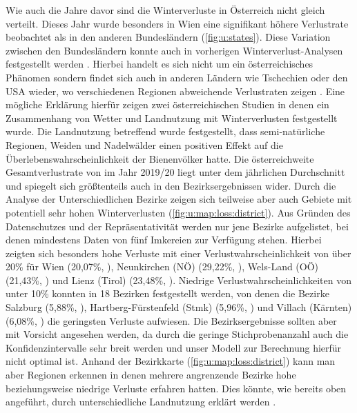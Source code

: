 Wie auch die Jahre davor sind die Winterverluste in Österreich nicht gleich verteilt. Dieses Jahr wurde besonders in Wien eine signifikant höhere Verlustrate beobachtet als in den anderen Bundesländern (\cref{fig:u:states}). Diese Variation zwischen den Bundesländern konnte auch in vorherigen Winterverlust-Analysen festgestellt werden \citep{crailsheim2018, brodschneider2018a, brodschneider2019b, oberreiter2020}. Hierbei handelt es sich nicht um ein österreichisches Phänomen sondern findet sich auch in anderen Ländern wie Tschechien oder den USA wieder, wo verschiedenen Regionen abweichende Verlustraten zeigen \citep{brodschneider2019,vanengelsdorp2008,vanengelsdorp2010}. Eine mögliche Erklärung hierfür zeigen zwei österreichischen Studien in denen ein Zusammenhang von Wetter \citep{switanek2017} und Landnutzung \citep{kuchling2018} mit Winterverlusten festgestellt wurde. Die Landnutzung betreffend wurde festgestellt, dass semi-natürliche Regionen, Weiden und Nadelwälder einen positiven Effekt auf die Überlebenswahrscheinlichkeit der Bienenvölker hatte.
\newline
Die österreichweite Gesamtverlustrate von  im Jahr 2019/20 liegt unter dem jährlichen Durchschnitt und spiegelt sich größtenteils auch in den Bezirksergebnissen wider. 
\newline
Durch die Analyse der Unterschiedlichen Bezirke zeigen sich teilweise aber auch Gebiete mit potentiell sehr hohen Winterverlusten (\cref{fig:u:map:loss:district}). Aus Gründen des Datenschutzes und der Repräsentativität werden nur jene Bezirke aufgelistet, bei denen mindestens Daten von fünf Imkereien zur Verfügung stehen. Hierbei zeigten sich besonders hohe Verluste mit einer Verlustwahrscheinlichkeit von über 20\% für Wien (20,07\%, ), Neunkirchen (NÖ) (29,22\%, ), Wels-Land (OÖ) (21,43\%, ) und Lienz (Tirol) (23,48\%, ). Niedrige Verlustwahrscheinlichkeiten von unter 10\% konnten in 18 Bezirken festgestellt werden, von denen die Bezirke Salzburg (5,88\%, ), Hartberg-Fürstenfeld (Stmk) (5,96\%, ) und Villach (Kärnten) (6,08\%, ) die geringsten Verluste aufwiesen.
\newline
Die Bezirksergebnisse sollten aber mit Vorsicht angesehen werden, da durch die geringe Stichprobenanzahl auch die Konfidenzintervalle sehr breit werden und unser Modell zur Berechnung hierfür nicht optimal ist. Anhand der Bezirkkarte (\cref{fig:u:map:loss:district}) kann man aber Regionen erkennen in denen mehrere angrenzende Bezirke hohe beziehungsweise niedrige Verluste erfahren hatten. Dies könnte, wie bereits oben angeführt, durch unterschiedliche Landnutzung erklärt werden \citep{kuchling2018}.


